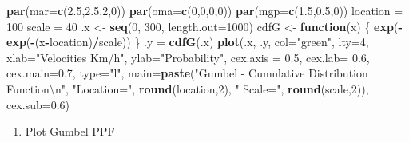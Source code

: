 \documentclass[12pt,twoside]{reedthesis}
\newenvironment{Shaded}{\begin{snugshade}}{\end{snugshade}}
\newcommand{\CharTok}[1]{\textcolor[rgb]{0.31,0.60,0.02}{#1}}
\newcommand{\ControlFlowTok}[1]{\textcolor[rgb]{0.13,0.29,0.53}{\textbf{#1}}}
\newcommand{\DataTypeTok}[1]{\textcolor[rgb]{0.13,0.29,0.53}{#1}}
\newcommand{\DecValTok}[1]{\textcolor[rgb]{0.00,0.00,0.81}{#1}}
\newcommand{\FloatTok}[1]{\textcolor[rgb]{0.00,0.00,0.81}{#1}}
\newcommand{\KeywordTok}[1]{\textcolor[rgb]{0.13,0.29,0.53}{\textbf{#1}}}
\newcommand{\NormalTok}[1]{#1}
\newcommand{\OperatorTok}[1]{\textcolor[rgb]{0.81,0.36,0.00}{\textbf{#1}}}
\newcommand{\StringTok}[1]{\textcolor[rgb]{0.31,0.60,0.02}{#1}}
\providecommand{\tightlist}{%
  \setlength{\itemsep}{0pt}\setlength{\parskip}{0pt}}
\begin{document}
\vspace{0.4cm}
\begin{Shaded}
\begin{Highlighting}[]
\KeywordTok{par}\NormalTok{(}\DataTypeTok{mar=}\KeywordTok{c}\NormalTok{(}\FloatTok{2.5}\NormalTok{,}\FloatTok{2.5}\NormalTok{,}\DecValTok{2}\NormalTok{,}\DecValTok{0}\NormalTok{))}
\KeywordTok{par}\NormalTok{(}\DataTypeTok{oma=}\KeywordTok{c}\NormalTok{(}\DecValTok{0}\NormalTok{,}\DecValTok{0}\NormalTok{,}\DecValTok{0}\NormalTok{,}\DecValTok{0}\NormalTok{))}
\KeywordTok{par}\NormalTok{(}\DataTypeTok{mgp=}\KeywordTok{c}\NormalTok{(}\FloatTok{1.5}\NormalTok{,}\FloatTok{0.5}\NormalTok{,}\DecValTok{0}\NormalTok{))}
\NormalTok{location =}\StringTok{ }\DecValTok{100}
\NormalTok{scale =}\StringTok{ }\DecValTok{40}
\NormalTok{.x <-}\StringTok{ }\KeywordTok{seq}\NormalTok{(}\DecValTok{0}\NormalTok{, }\DecValTok{300}\NormalTok{, }\DataTypeTok{length.out=}\DecValTok{1000}\NormalTok{)}
\NormalTok{cdfG <-}\StringTok{ }\ControlFlowTok{function}\NormalTok{(x) \{}
  \KeywordTok{exp}\NormalTok{(}\OperatorTok{-}\KeywordTok{exp}\NormalTok{(}\OperatorTok{-}\NormalTok{(x}\OperatorTok{-}\NormalTok{location)}\OperatorTok{/}\NormalTok{scale))}
\NormalTok{  \}}
\NormalTok{.y =}\StringTok{ }\KeywordTok{cdfG}\NormalTok{(.x)}
\KeywordTok{plot}\NormalTok{(.x, .y, }\DataTypeTok{col=}\StringTok{"green"}\NormalTok{, }\DataTypeTok{lty=}\DecValTok{4}\NormalTok{, }\DataTypeTok{xlab=}\StringTok{"Velocities Km/h"}\NormalTok{, }\DataTypeTok{ylab=}\StringTok{"Probability"}\NormalTok{, }\DataTypeTok{cex.axis =} \FloatTok{0.5}\NormalTok{, }\DataTypeTok{cex.lab=} \FloatTok{0.6}\NormalTok{, }\DataTypeTok{cex.main=}\FloatTok{0.7}\NormalTok{, }\DataTypeTok{type=}\StringTok{"l"}\NormalTok{,}
 \DataTypeTok{main=}\KeywordTok{paste}\NormalTok{(}\StringTok{"Gumbel - Cumulative Distribution Function}\CharTok{\textbackslash{}n}\StringTok{"}\NormalTok{, }\StringTok{"Location="}\NormalTok{, }\KeywordTok{round}\NormalTok{(location,}\DecValTok{2}\NormalTok{), }\StringTok{" Scale="}\NormalTok{, }\KeywordTok{round}\NormalTok{(scale,}\DecValTok{2}\NormalTok{)), }\DataTypeTok{cex.sub=}\FloatTok{0.6}\NormalTok{)}
\end{Highlighting}
\end{Shaded}
\normalsize
\begin{enumerate}
\def\labelenumi{\arabic{enumi}.}
\setcounter{enumi}{3}
\tightlist
\item
  Plot Gumbel PPF
\end{enumerate}
\tiny
\end{document}
